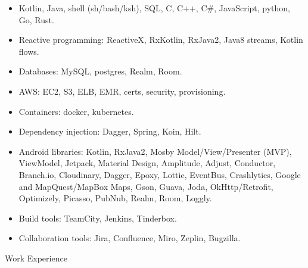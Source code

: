 \begin{itemize}
\item Kotlin, Java, shell (sh/bash/ksh), SQL, C, C++, C\#, JavaScript, python, Go, Rust. \\[-18pt]
\item Reactive programming: ReactiveX, RxKotlin, RxJava2, Java8 streams, Kotlin flows. \\[-18pt]
\item Databases: MySQL, postgres, Realm, Room.  \\[-18pt]
\item AWS: EC2, S3, ELB, EMR, certs, security, provisioning.  \\[-18pt]
\item Containers: docker, kubernetes.  \\[-18pt]
\item Dependency injection: Dagger, Spring, Koin, Hilt.   \\[-18pt]
\item Android libraries:
	Kotlin, RxJava2, Mosby Model/View/Presenter (MVP), ViewModel, Jetpack, Material Design,
	   Amplitude, Adjust, Conductor, Branch.io, Cloudinary, Dagger, Epoxy, Lottie, EventBus, Crashlytics,
	   Google and MapQuest/MapBox Maps, Gson, Guava, Joda, OkHttp/Retrofit, Optimizely, Picasso, PubNub,
	   Realm, Room, Loggly. \\[-18pt]
\item Build tools: TeamCity, Jenkins, Tinderbox.   \\[-18pt]
\item Collaboration tools: Jira, Confluence, Miro, Zeplin, Bugzilla.   \\
\end{itemize}


\begin{bf} \large
Work Experience
\end{bf}
\medskip


